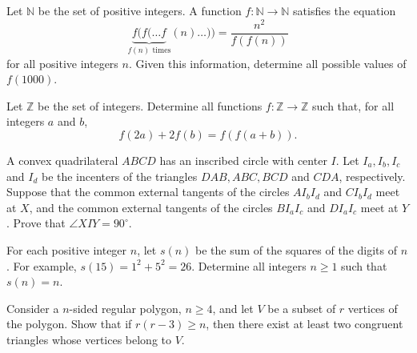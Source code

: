 \documentclass[11pt]{scrartcl}
\begin{document}
\begin{problem}[18644549011438]
Let $\mathbb{N}$ be the set of positive integers. A function $f:\mathbb{N}\to\mathbb{N}$ satisfies the equation\[\underbrace{f(f(\ldots f}_{f(n)\text{ times}}(n)\ldots))=\frac{n^2}{f(f(n))}\]for all positive integers $n$. Given this information, determine all possible values of $f(1000)$.
\end{problem}
\begin{problem}[684265043263216]
Let $\mathbb{Z}$ be the set of integers. Determine all functions $f: \mathbb{Z} \rightarrow \mathbb{Z}$ such that, for all integers $a$ and $b$,$$f(2a)+2f(b)=f(f(a+b)).$$
\end{problem}
\begin{problem}[4451072691230235426]
A convex quadrilateral $ABCD$ has an inscribed circle with center $I$. Let $I_a, I_b, I_c$ and $I_d$ be the incenters of the triangles $DAB, ABC, BCD$ and $CDA$, respectively. Suppose that the common external tangents of the circles $AI_bI_d$ and $CI_bI_d$ meet at $X$, and the common external tangents of the circles $BI_aI_c$ and $DI_aI_c$ meet at $Y$. Prove that $\angle{XIY}=90^{\circ}$.
\end{problem}
\begin{problem}[5707875418806483255]
For each positive integer $n$, let $s(n)$ be the sum of the squares of the digits of $n$. For example, $s(15)=1^2+5^2=26$. Determine all integers $n\geq 1$ such that $s(n)=n$.
\end{problem}
\begin{problem}[3173124324482060330]
Consider a $n$-sided regular polygon, $n \geq 4$, and let $V$ be a subset of $r$ vertices of the polygon. Show that if $r(r-3) \geq n$, then there exist at least two congruent triangles whose vertices belong to $V$.
\end{problem}
\end{document}
